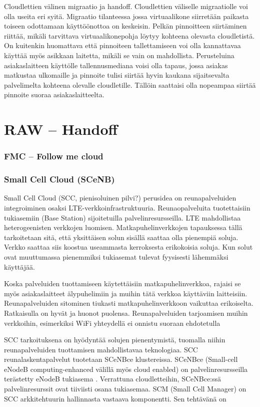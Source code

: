 \documentclass[finnish]{tktltiki2}
\theoremstyle{definition}
\theoremstyle{remark}
\begin{document}
\begin{itemize}
Cloudlettien välinen migraatio ja handoff. 
Cloudlettien väliselle migraatiolle voi olla useita eri syitä.
Migraatio tilanteessa jossa virtuaalikone siirretään paikasta toiseen odottamaan käyttöönottoa on keskeisin.
Pelkän pinnoitteen siirtäminen riittää, mikäli tarvittava virtuaalikonepohja löytyy kohteena olevasta cloudletistä.
On kuitenkin huomattava että pinnoiteen tallettamiseen voi olla kannattavaa käyttää myös asikkaan laitetta, mikäli se vain on mahdollista.
Perusteluina asiakaslaitteen käyttölle tallennusmediana voisi olla tapaus, jossa asiakas matkustaa ulkomaille ja pinnoite tulisi siirtää hyvin kaukana sijaitsevalta palvelimelta kohteena olevalle cloudletille. Tällöin saattaisi olla nopeampaa siirtää pinnoite suoraa asiakaslaitteelta.

\chapter*{RAW – Handoff} 


\subsection{FMC – Follow me cloud}
\subsection{Small Cell Cloud (SCeNB)}
Small Cell Cloud (SCC, pienisoluinen pilvi?) perusidea on reunapalveluiden integroiminen osaksi LTE-verkkoinfrastruktuuria. 
Reunaopalveluita tuotettaisiin tukiasemiin (Base Station) sijoitetuilla palvelinresursseilla.
LTE mahdollistaa heterogeenisten verkkojen luomisen. Matkapuhelinverkkojen tapauksessa tällä tarkoitetaan sitä, että yksittäisen solun sisällä saattaa olla pienempiä soluja.
Verkko saattaa siis koostua useammasta kerroksesta erikokoisia soluja. 
Kun solut ovat muuttumassa pienemmiksi tukiasemat tulevat fyysisesti lähemmäksi käyttäjää.

Koska palveluiden tuottamiseen käytettäisiin matkapuhelinverkkoa, rajaisi se myös asiakaslaitteet älypuhelimiin ja muihin tätä verkkoa käyttäviin laitteisiin.
Reunapalveluiden sitominen tiukasti matkapuhelinverkkoon vaikuttaa erikoiselta.
Ratkaisulla on hyvät ja huonot puolensa. Reunapalveluiden tarjoamisen muihin verkkoihin, esimerkiksi WiFi yhteydellä ei onnistu suoraan ehdotetulla 

SCC tarkoituksena on hyödyntää solujen pienentymistä, tuomalla niihin reunapalveluiden tuottamisen mahdollistavaa teknologiaa.
SCC reunalaskentapalvelut tuotetaan SCeNBce klustereissa. 
SCeNBce (Small-cell eNodeB computing-enhanced välillä myös cloud enabled) on palvelinresursseilla terästetty eNodeB tukiasema \cite{lobillo15scc}.
Verrattuna cloudletteihin, SCeNBce:ssä palvelinresurssit ovat tiiviisti osana tukiasemaa.
SCM (Small Cell Manager) on SCC arkkitehtuurin hallinnasta vastaava komponentti. Sen tehtävänä on 


\end{itemize}
\end{document}
